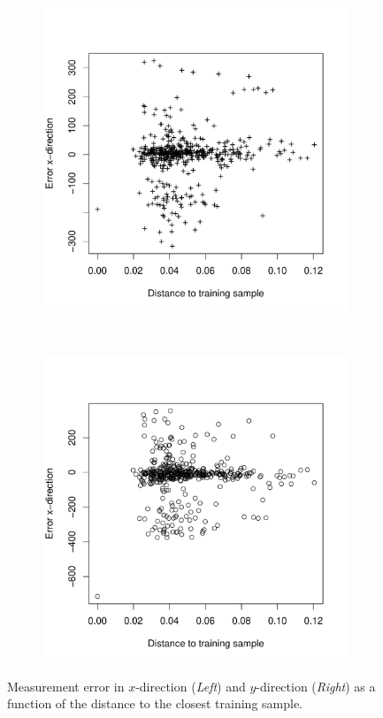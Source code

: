 \documentclass[11pt]{report}
\begin{document}
\begin{figure}
  \centering
  \begin{subfigure}[b]{0.5\textwidth}
  \includegraphics[width=1\textwidth]{dependency_dist_error_x}
  \label{fig:cosinesim}
  \end{subfigure}%
~
  \begin{subfigure}[b]{0.5\textwidth}
  \includegraphics[width=1\textwidth]{dependency_dist_error_y}
  \label{fig:cosinesd}
  \end{subfigure}
  \caption{Measurement error in $x$-direction (\emph{Left}) and
    $y$-direction (\emph{Right}) as a function of the distance to the
    closest training sample.}
\label{fig:cor_sim_confi}
\end{figure}
\end{document}
